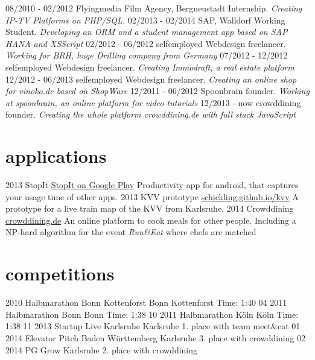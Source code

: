 \documentclass[]{friggeri-cv}
\begin{document}
\begin{entrylist}
  \entry
    {08/2010 - 02/2012}
    {Flyingmedia Film Agency, Bergneustadt}
    {Internship.}
    {\emph{Creating IP-TV Platforms on PHP/SQL.}}
  \entry
    {02/2013 - 02/2014}
    {SAP, Walldorf}
    {Working Student.}
    {\emph{Developing an ORM and a student management app based on SAP HANA and XSScript}}
  \entry
    {02/2012 - 06/2012}
    {selfemployed}
    {Webdesign freelancer.}
    {\emph{Working for BRH, huge Drilling company from Germany}}
  \entry
    {07/2012 - 12/2012}
    {selfemployed}
    {Webdesign freelancer.}
    {\emph{Creating Immodraft, a real estate platform}}
  \entry
    {12/2012 - 06/2013}
    {selfemployed}
    {Webdesign freelancer.}
    {\emph{Creating an online shop for vinoko.de based on ShopWare}}
  \entry
    {12/2011 - 06/2012}
    {Spoonbrain}
    {founder.}
    {\emph{Working at spoonbrain, an online platform for video tutorials}}
  \entry
    {12/2013 - now}
    {crowddining}
    {founder.}
    {\emph{Creating the whole platform crowddining.de with full stack JavaScript}}
\end{entrylist}

\section{applications}

\begin{entrylist}
  \entry
    {2013}
    {StopIt}
    {\href{https://play.google.com/store/apps/details?id=de.timsuchanek.stopit&hl=en}{StopIt on Google Play}}
    {Productivity app for android, that captures your usage time of other apps.}
  \entry
    {2013}
    {KVV prototype}
    {\href{http://schickling.github.io/kvv}{schickling.github.io/kvv}}
    {A prototype for a live train map of the KVV from Karlsruhe.}
  \entry
    {2014}
    {Crowddining}
    {\href{http://crowddining.de}{crowddining.de}}
    {An online platform to cook meals for other people. Including a NP-hard algorithm for the event \emph{Run&Eat} where chefs are matched}
\end{entrylist}

\section{competitions}

\begin{entrylist}
  \entry
    {2010}
    {Halbmarathon Bonn Kottenforst}
    {Bonn Kottenforst}
    {Time: 1:40}
  \entry
    {04 2011}
    {Halbmarathon Bonn}
    {Bonn}
    {Time: 1:38}
  \entry
    {10 2011}
    {Halbmarathon Köln}
    {Köln}
    {Time: 1:38}
  \entry
    {11 2013}
    {Startup Live Karlsruhe}
    {Karlsruhe}
    {1. place with team meet&eat}
  \entry
    {01 2014}
    {Elevator Pitch Baden Württemberg}
    {Karlsruhe}
    {3. place with crowddining}
  \entry
    {02 2014}
    {PG Grow}
    {Karlsruhe}
    {2. place with crowddining}
\end{entrylist}
\end{document}
